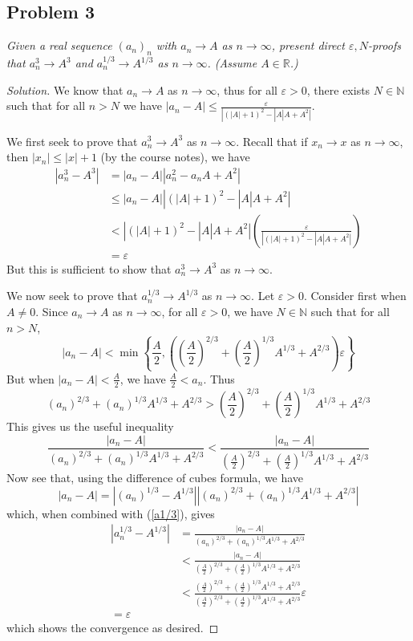 \documentclass{article}
\newcommand{\N}{{\mathbb N}}
\newcommand{\R}{{\mathbb R}}
\newcommand{\ep}{{\varepsilon}}
\begin{document}
\subsection*{Problem 3}
{\it Given a real sequence $(a_n)_n$ with $a_n \to A$ as $n \to \infty$,
present direct $\ep,N$-proofs that $a_n^3\to A^3$
and $a_n^{1/3} \to A^{1/3}$ as $n \to \infty$.
(Assume $A \in \R$.)}

\begin{proof}[Solution]\let\qed\relax
	We know that $a_n \to A$ as $n \to \infty$,
	thus for all $\ep > 0$, there exists $N \in \N$ such that for all $n > N$
	we have $|a_n - A| \leq \frac{\ep}{|(|A|+1)^2 - |A|A+A^2|}$.
	
	We first seek to prove that $a^3_n \to A^3$ as $n \to \infty$.
	Recall that if $x_n \to x$ as $n \to \infty$, then $|x_n| \leq |x| + 1$
	(by the course notes), we have
	\begin{align*}
		|a_n^3 - A^3|
		&= |a_n - A||a_n^2 - a_nA + A^2|\\
		&\leq |a_n - A||(|A|+1)^2 - |A|A + A^2|\\
		&< |(|A| + 1)^2 - |A|A + A^2|\left(\frac{\ep}{|(|A|+1)^2-|A|A+A^2|}\right)\\
		&= \ep
	\end{align*}
	But this is sufficient to show that $a_n^3 \to A^3$ as $n \to \infty$.

	We now seek to prove that $a_n^{1/3} \to A^{1/3}$ as $n \to \infty$.
	Let $\ep > 0$.
	Consider first when $A \neq 0$.
	Since $a_n \to A$ as $n \to \infty$,
	for all $\ep>0$, we have $N \in \N$ such that for all $n > N$,
	\[
		|a_n - A| < \min\left\{\frac{A}{2},\left(\left(\frac{A}{2}\right)^{2/3} + \left(\frac{A}{2}\right)^{1/3}A^{1/3} + A^{2/3}\right)\ep\right\}
	\]
	But when $|a_n - A| < \frac{A}{2}$,
	we have $\frac{A}{2} < a_n$. Thus
	\[
		(a_n)^{2/3} + (a_n)^{1/3}A^{1/3}+A^{2/3} > \left(\frac{A}{2}\right)^{2/3} + \left(\frac{A}{2}\right)^{1/3}A^{1/3}+A^{2/3}
	\]
	This gives us the useful inequality
	\begin{equation}\label{a1/3}
		\frac{|a_n - A|}{(a_n)^{2/3} + (a_n)^{1/3}A^{1/3} + A^{2/3}}
		< \frac{|a_n - A|}{\left(\frac{A}{2}\right)^{2/3} + \left(\frac{A}{2}\right)^{1/3}A^{1/3} + A^{2/3}}
	\end{equation}
	Now see that, using the difference of cubes formula, we have
	\[
		|a_n - A| = |(a_n)^{1/3} - A^{1/3}||(a_n)^{2/3} + (a_n)^{1/3}A^{1/3} + A^{2/3}|
	\]
	which, when combined with (\ref{a1/3}), gives
	\begin{align*}
		|a_n^{1/3} - A^{1/3}|
		& = \frac{|a_n - A|}{(a_n)^{2/3} + (a_n)^{1/3}A^{1/3} + A^{2/3}}\\
		&< \frac{|a_n - A|}{\left(\frac{A}{2}\right)^{2/3} + \left(\frac{A}{2}\right)^{1/3}A^{1/3} + A^{2/3}}\\
		&< \frac{\left(\frac{A}{2}\right)^{2/3} + \left(\frac{A}{2}\right)^{1/3}A^{1/3} + A^{2/3}}{\left(\frac{A}{2}\right)^{2/3} + \left(\frac{A}{2}\right)^{1/3}A^{1/3} + A^{2/3}}\ep\\
		= \ep
	\end{align*}
	which shows the convergence as desired.


\end{proof}
\end{document}
